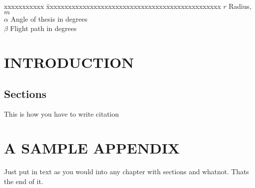 \documentclass[BTech]{nitgoathesis}
\begin{document}
\begin{singlespace}
\begin{tabbing}
xxxxxxxxxxx \= xxxxxxxxxxxxxxxxxxxxxxxxxxxxxxxxxxxxxxxxxxxxxxxx \kill
\textbf{$r$}  \> Radius, $m$ \\
\textbf{$\alpha$}  \> Angle of thesis in degrees \\
\textbf{$\beta$}   \> Flight path in degrees \\
\end{tabbing}
\end{singlespace}

\pagebreak
\clearpage




\chapter{INTRODUCTION}
\label{chap:intro}
\section{Sections}
This is how you have to write citation \cite{DBLP:journals/tit/IngemarssonTW82}
\appendix

\chapter{A SAMPLE APPENDIX}

Just put in text as you would into any chapter with sections and
whatnot.  Thats the end of it.


\begin{singlespace}
  
\end{singlespace}




\end{document}
